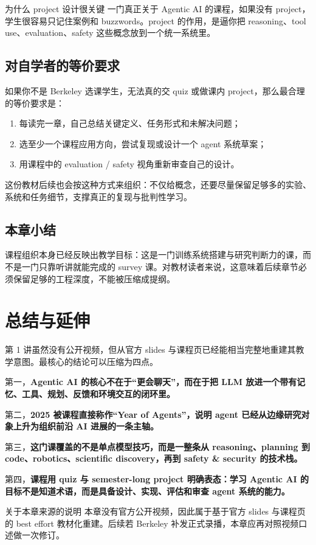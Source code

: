 \documentclass[a4paper]{article}
\begin{document}
\begin{importantbox}{为什么 project 设计很关键}
一门真正关于 Agentic AI 的课程，如果没有 project，学生很容易只记住案例和 buzzwords。project 的作用，是逼你把 reasoning、tool use、evaluation、safety 这些概念放到一个统一系统里。
\end{importantbox}

\subsection{对自学者的等价要求}
如果你不是 Berkeley 选课学生，无法真的交 quiz 或做课内 project，那么最合理的等价要求是：
\begin{enumerate}[leftmargin=1.5em]
\item 每读完一章，自己总结关键定义、任务形式和未解决问题；
\item 选至少一个课程应用方向，尝试复现或设计一个 agent 系统草案；
\item 用课程中的 evaluation / safety 视角重新审查自己的设计。
\end{enumerate}

这份教材后续也会按这种方式来组织：不仅给概念，还要尽量保留足够多的实验、系统和任务细节，支撑真正的复现与批判性学习。

\subsection{本章小结}
课程组织本身已经反映出教学目标：这是一门训练系统搭建与研究判断力的课，而不是一门只靠听讲就能完成的 survey 课。对教材读者来说，这意味着后续章节必须保留足够的工程深度，不能被压缩成提纲。

\section{总结与延伸}
第 1 讲虽然没有公开视频，但从官方 slides 与课程页已经能相当完整地重建其教学意图。最核心的结论可以压缩为四点。

第一，\textbf{Agentic AI 的核心不在于“更会聊天”，而在于把 LLM 放进一个带有记忆、工具、规划、反馈和环境交互的闭环里。}

第二，\textbf{2025 被课程直接称作“Year of Agents”，说明 agent 已经从边缘研究对象上升为组织前沿 AI 进展的一条主轴。}

第三，\textbf{这门课覆盖的不是单点模型技巧，而是一整条从 reasoning、planning 到 code、robotics、scientific discovery，再到 safety \& security 的技术栈。}

第四，\textbf{课程用 quiz 与 semester-long project 明确表态：学习 Agentic AI 的目标不是知道术语，而是具备设计、实现、评估和审查 agent 系统的能力。}

\begin{warningbox}{关于本章来源的说明}
本章没有官方公开视频，因此属于基于官方 slides 与课程页的 best effort 教材化重建。后续若 Berkeley 补发正式录播，本章应再对照视频口述做一次修订。
\end{warningbox}
\end{document}
